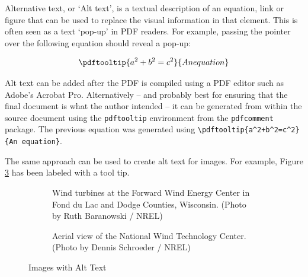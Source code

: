Alternative text, or `Alt text', is a textual description of an equation, link or figure that can be used to replace the visual information in that element. This is often seen as a text `pop-up' in PDF readers. For example, passing the pointer over the following equation should reveal a pop-up:

\begin{equation}
\pdftooltip{a^2+b^2=c^2}{An equation}
\end{equation}

Alt text can be added after the PDF is compiled using a PDF editor such as Adobe's Acrobat Pro. Alternatively -- and probably best for ensuring that the final document is what the author intended -- it can be generated from within the source document using the \texttt{pdftooltip} environment from the \texttt{pdfcomment} package. The previous equation was generated using \verb?\pdftooltip{a^2+b^2=c^2}{An equation}?.

The same approach can be used to create alt text for images. For example, Figure \ref{fig:NRELimagesWithAltText} has been labeled with a tool tip. 

\begin{figure}
	\centering
        \begin{subfigure}[t]{.45\linewidth}
		\centering
		{}
		\caption{Wind turbines at the Forward Wind Energy Center in Fond du Lac and Dodge Counties, Wisconsin. (Photo by Ruth Baranowski / NREL)}\label{fig:21206WithAltText}
	\end{subfigure}%
        \hfill
        \begin{subfigure}[t]{.45\linewidth}
		\centering
		{}
		\caption{Aerial view of the National Wind Technology Center. (Photo by Dennis Schroeder / NREL)}\label{fig:20018WithAltText}
	\end{subfigure}
	\caption{Images with Alt Text}\label{fig:NRELimagesWithAltText}
\end{figure}